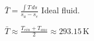 \( \bar{T} = \frac{\int T \, ds}{s_a - s_e} \)  
Ideal fluid.  

\( \bar{T} \approx \frac{T_{ein} + T_{aus}}{2} \approx 293.15 \, \text{K} \)